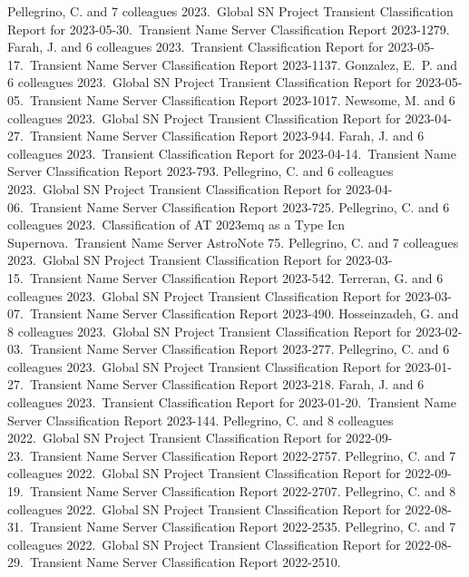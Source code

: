 \documentclass[margin,line]{res}
\begin{document}
\begin{resume}
 Pellegrino, C. and 7 colleagues 2023.\ Global SN Project Transient Classification Report for 2023-05-30.\ Transient Name Server Classification Report 2023-1279.
 Farah, J. and 6 colleagues 2023.\ Transient Classification Report for 2023-05-17.\ Transient Name Server Classification Report 2023-1137.
 Gonzalez, E.~P. and 6 colleagues 2023.\ Global SN Project Transient Classification Report for 2023-05-05.\ Transient Name Server Classification Report 2023-1017.
 Newsome, M. and 6 colleagues 2023.\ Global SN Project Transient Classification Report for 2023-04-27.\ Transient Name Server Classification Report 2023-944.
 Farah, J. and 6 colleagues 2023.\ Transient Classification Report for 2023-04-14.\ Transient Name Server Classification Report 2023-793.
 Pellegrino, C. and 6 colleagues 2023.\ Global SN Project Transient Classification Report for 2023-04-06.\ Transient Name Server Classification Report 2023-725.
 Pellegrino, C. and 6 colleagues 2023.\ Classification of AT 2023emq as a Type Icn Supernova.\ Transient Name Server AstroNote 75.
 Pellegrino, C. and 7 colleagues 2023.\ Global SN Project Transient Classification Report for 2023-03-15.\ Transient Name Server Classification Report 2023-542.
 Terreran, G. and 6 colleagues 2023.\ Global SN Project Transient Classification Report for 2023-03-07.\ Transient Name Server Classification Report 2023-490.
 Hosseinzadeh, G. and 8 colleagues 2023.\ Global SN Project Transient Classification Report for 2023-02-03.\ Transient Name Server Classification Report 2023-277.
 Pellegrino, C. and 6 colleagues 2023.\ Global SN Project Transient Classification Report for 2023-01-27.\ Transient Name Server Classification Report 2023-218.
 Farah, J. and 6 colleagues 2023.\ Transient Classification Report for 2023-01-20.\ Transient Name Server Classification Report 2023-144.
 Pellegrino, C. and 8 colleagues 2022.\ Global SN Project Transient Classification Report for 2022-09-23.\ Transient Name Server Classification Report 2022-2757.
 Pellegrino, C. and 7 colleagues 2022.\ Global SN Project Transient Classification Report for 2022-09-19.\ Transient Name Server Classification Report 2022-2707.
 Pellegrino, C. and 8 colleagues 2022.\ Global SN Project Transient Classification Report for 2022-08-31.\ Transient Name Server Classification Report 2022-2535.
 Pellegrino, C. and 7 colleagues 2022.\ Global SN Project Transient Classification Report for 2022-08-29.\ Transient Name Server Classification Report 2022-2510.


\end{resume}
\end{document}
